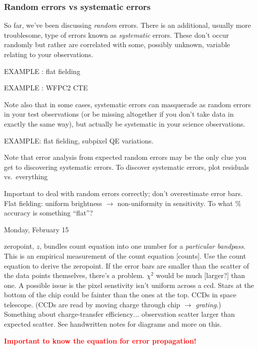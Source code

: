 \documentclass[12pt]{article}
\begin{document}
\subsubsection{Random errors vs systematic errors}
So far, we've been discussing \emph{random} errors.
There is an additional,
usually more troublesome, type of errors known as \emph{systematic} errors.
These don't occur randomly but rather are correlated with some,
possibly unknown, variable relating to your observations.

EXAMPLE : flat fielding

EXAMPLE : WFPC2 CTE

Note also that in some cases, systematic errors can masquerade as
random errors in your test observations (or be missing altogether if
you don't take data in exactly the same way), but actually be
systematic in your science observations.

EXAMPLE: flat fielding, subpixel QE variations.

Note that error analysis from expected random errors may be the only
clue you get to discovering systematic errors. To discover systematic
errors, plot residuals vs.\ everything

\textcolor{om}{\emph{}}

\textcolor{myBlue}{Important to deal with random errors correctly;
    don't overestimate error bars.
    Flat fielding: uniform brightness $\rightarrow$ non-uniformity in
    sensitivity. To what \% accuracy is something ``flat''?
}

\textcolor{date}{Monday, February 15}

\textcolor{myBlue}{zeropoint, $z$, bundles count equation into one
    number for a \emph{particular bandpass}. This is an empirical
    measurement of the count equation [counts]. Use the count
    equation to derive the zeropoint.
    If the error bars are smaller than the scatter of the data points
    themselves, there's a problem. $\chi^{2}$ would be much [larger?]
    than one.
    A possible issue is the pixel senstivity isn't uniform across a
    ccd. Stars at the bottom of the chip could be fainter than the
    ones at the top. CCDs in space telescope. (CCDs are read
    by moving charge through chip $\rightarrow$ \emph{grating}.)
    Something about charge-transfer efficiency$\ldots$ observation
    scatter larger than expected scatter.
    See handwritten notes for diagrams and more on this.
}

\textcolor{red}{\textbf{Important to know the equation for error
propagation!}
}
\end{document}
